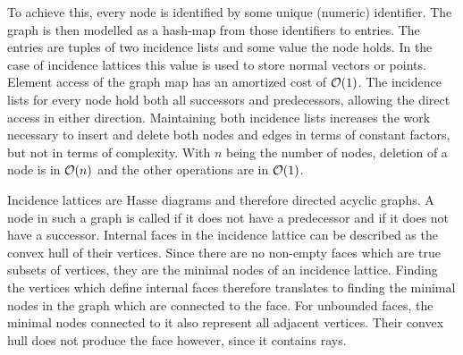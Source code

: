 To achieve this, every node is identified by some unique (numeric) identifier.
The graph is then modelled as a hash-map from those identifiers to entries.
The entries are tuples of two incidence lists and some value the node holds.
In the case of incidence lattices this value is used to store normal vectors or points.
Element access of the graph map has an amortized cost of $\mathcal{O}(1)$.
The incidence lists for every node hold both all successors and predecessors, allowing the direct access in either direction.
Maintaining both incidence lists increases the work necessary to insert and delete both nodes and edges in terms of constant factors, but not in terms of complexity.
With $n$ being the number of nodes, deletion of a node is in $\mathcal{O}(n)$ and the other operations are in $\mathcal{O}(1)$.

Incidence lattices are Hasse diagrams and therefore directed acyclic graphs.
A node in such a graph is called  if it does not have a predecessor and  if it does not have a successor.
Internal faces in the incidence lattice can be described as the convex hull of their vertices.
Since there are no non-empty faces which are true subsets of vertices, they are the minimal nodes of an incidence lattice.
Finding the vertices which define internal faces therefore translates to finding the minimal nodes in the graph which are connected to the face.
For unbounded faces, the minimal nodes connected to it also represent all adjacent vertices.
Their convex hull does not produce the face however, since it contains rays.

